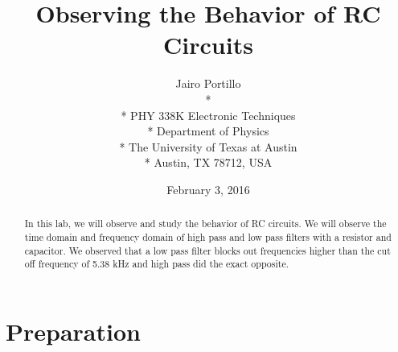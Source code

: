 \documentclass[11pt,letterpaper,onecolumn]{article}
\begin{document}

\title{\bf Observing the Behavior of RC Circuits}

\author{
 Jairo Portillo \\*
  \\*
 PHY 338K Electronic Techniques \\*
 Department of Physics \\*
 The University of Texas at Austin \\*
 Austin, TX 78712, USA
}
\date{February 3, 2016}


\maketitle


\begin{abstract}

In this lab, we will observe and study the behavior of RC circuits. We will observe the time domain and frequency domain of high pass and low pass filters with a resistor and capacitor. We observed that a low pass filter blocks out frequencies higher than the cut off frequency of 5.38 kHz and high pass did the exact opposite.
\end{abstract}



\section{Preparation}
\end{document}
